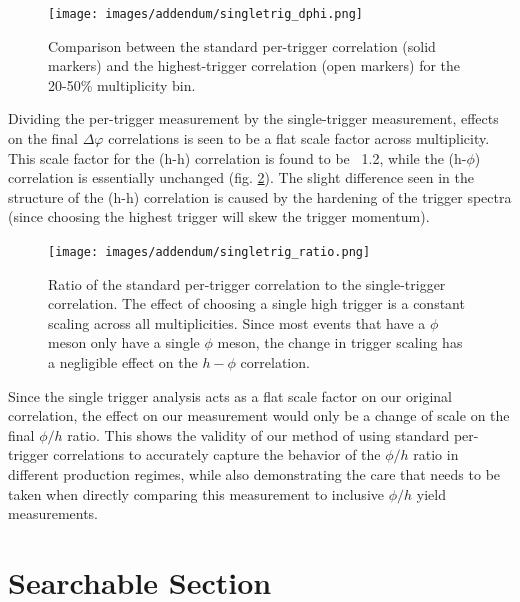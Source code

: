 \documentclass[ALICE,manyauthors]{ALICE_analysis_notes}
\begin{document}
\begin{figure}[!htb]
\centering
\texttt{[image: images/addendum/singletrig\_dphi.png]}
\caption{Comparison between the standard per-trigger correlation (solid markers) and the highest-trigger correlation (open markers) for the 20-50\% multiplicity bin.}
\label{singletrigcorr}
\end{figure}

Dividing the per-trigger measurement by the single-trigger measurement,  effects on the final $\Delta\varphi$ correlations is seen to be a flat scale factor across multiplicity. This scale factor for the (h-h) correlation is found to be ~1.2, while the (h-$\phi$) correlation is essentially unchanged (fig. \ref{singletrigratio}).  The slight difference seen in the structure of the (h-h) correlation is caused by the hardening of the trigger spectra (since choosing the highest trigger will skew the trigger momentum).

\begin{figure}[!htb]
\centering
\texttt{[image: images/addendum/singletrig\_ratio.png]}
\caption{Ratio of the standard per-trigger correlation to the single-trigger correlation. The effect of choosing a single high trigger is a constant scaling across all multiplicities.  Since most events that have a $\phi$ meson only have a single $\phi$ meson, the change in trigger scaling has a negligible effect on the $h-\phi$ correlation.}
\label{singletrigratio}
\end{figure}

Since the single trigger analysis acts as a flat scale factor on our original correlation, the effect on our measurement would only be a change of scale on the final $\phi/h$ ratio.  This shows the validity of our method of using standard per-trigger correlations to accurately capture the behavior of the $\phi/h$ ratio in different production regimes, while also demonstrating the care that needs to be taken when directly comparing this measurement to inclusive $\phi/h$ yield measurements. 



\clearpage
\section{Searchable Section}
\end{document}
